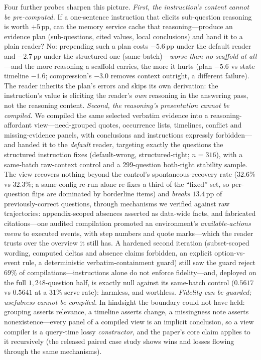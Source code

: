 \documentclass{article} %
\newcommand{\pp}{\,\mathrm{pp}}
\begin{document}
Four further probes sharpen this picture.
\emph{First, the instruction's content cannot be pre-computed.} If a
one-sentence instruction that elicits sub-question reasoning is worth
$+5\pp$, can the memory service cache that reasoning---produce an evidence
plan (sub-questions, cited values, local conclusions) and hand it to a plain
reader? No: prepending such a plan costs $-5.6\pp$ under the default reader
and $-2.7\pp$ under the structured one (same-batch)---\emph{worse than no
scaffold at all}---and the more reasoning a scaffold carries, the more it
hurts (plan $-5.6$ vs state timeline $-1.6$; compression's $-3.0$ removes
context outright, a different failure). The reader inherits the plan's errors
and skips its own derivation: the instruction's value is eliciting the
reader's \emph{own} reasoning in the answering pass, not the reasoning
content. \emph{Second, the reasoning's presentation cannot be compiled.} We
compiled the same selected verbatim evidence into a reasoning-affordant
view---need-grouped quotes, occurrence lists, timelines, conflict and
missing-evidence panels, with conclusions and instructions expressly
forbidden---and handed it to the \emph{default} reader, targeting exactly the
questions the structured instruction fixes (default-wrong, structured-right;
$n{=}316$), with a same-batch raw-context control and a $299$-question
both-right stability sample. The view recovers nothing beyond the control's
spontaneous-recovery rate ($32.6\%$ vs $32.3\%$; a same-config re-run alone
re-fixes a third of the ``fixed'' set, so per-question flips are dominated by
borderline items) and \emph{breaks} $13.4\pp$ of previously-correct questions,
through mechanisms we verified against raw trajectories: appendix-scoped
absences asserted as data-wide facts, and fabricated citations---one audited
compilation promoted an environment's \emph{available-actions menu} to
executed events, with step numbers and quote marks---which the reader trusts
over the overview it still has. A hardened second iteration (subset-scoped
wording, computed deltas and absence claims forbidden, an explicit
option-vs-event rule, a deterministic verbatim-containment guard) still saw
the guard reject $69\%$ of compilations---instructions alone do not enforce
fidelity---and, deployed on the full $1{,}248$-question half, is exactly null
against its same-batch control ($0.5617$ vs $0.5641$ at a $31\%$ serve rate):
harmless, and worthless. \emph{Fidelity can be guarded; usefulness cannot be
compiled.} In hindsight the boundary could not have held: grouping asserts
relevance, a timeline asserts change, a missingness note asserts
nonexistence---every panel of a compiled view is an implicit conclusion, so a
view compiler is a query-time lossy \emph{constructor}, and the paper's core
claim applies to it recursively (the released paired case study shows wins and
losses flowing through the same mechanisms).
\end{document}
